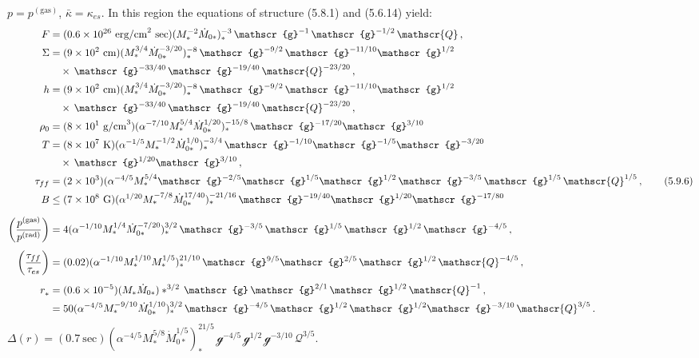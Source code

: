 \noindent
$p = p^{(\text{gas})}$, $\bar{\kappa} = \kappa_{es}$.  In this region the equations of structure (5.8.1) and (5.6.14)
yield:
%
\begin{align}
F &= (0.6 \times 10^{26}~\text{erg/cm}^2~\text{sec})(M_*^{-2} \dot{M}_{0*})_*^{-3}\,\mathscr{g}^{-1}\,\mathscr{g}^{-1/2}\,\mathscr{Q}\,,
\notag\\
\Sigma &= (9 \times 10^2~\text{cm})(M_*^{3/4}\dot{M}_{0*}^{-3/20})_*^{-8}\,\mathscr{g}^{-9/2}\,\mathscr{g}^{-11/10}\mathscr{g}^{1/2}
\notag\\
&\quad \times\,\mathscr{g}^{-33/40}\,\mathscr{g}^{-19/40}\,\mathscr{Q}^{-23/20}\,,
\notag\\
h &= (9 \times 10^2~\text{cm})(M_*^{3/4}\dot{M}_{0*}^{-3/20})_*^{-8}\,\mathscr{g}^{-9/2}\,
\mathscr{g}^{-11/10}\mathscr{g}^{1/2}
\notag\\
&\quad \times\,\mathscr{g}^{-33/40}\,\mathscr{g}^{-19/40}\,\mathscr{Q}^{-23/20}\,,
\notag\\
\rho_0 &= (8 \times 10^1~\text{g/cm}^3)(\alpha^{-7/10} M_*^{5/4} \dot{M}_{0*}^{1/20})_*^{-15/8}\,\mathscr{g}^{-17/20}\mathscr{g}^{3/10}
\notag\\
T &= (8 \times 10^7~\text{K})(\alpha^{-1/5}M_*^{-1/2}\dot{M}_{0*}^{1/0})_*^{-3/4}\,\mathscr{g}^{-1/10}\mathscr{g}^{-1/5}\mathscr{g}^{-3/20}
\notag\\
&\quad \times\,\mathscr{g}^{1/20}\mathscr{g}^{3/10}\,,
\notag\\
\tau_{ff} &= (2 \times 10^3)(\alpha^{-4/5}M_*^{5/4}\mathscr{g}^{-2/5}\mathscr{g}^{1/5}\mathscr{g}^{1/2}\,\mathscr{g}^{-3/5}\,\mathscr{g}^{1/5}\,\mathscr{Q}^{1/5}\,,
\tag{5.9.6}\\
B &\leq (7 \times 10^8~\text{G})(\alpha^{1/20}M_*^{-7/8}\dot{M}_{0*}^{17/40})_*^{-21/16}\,\mathscr{g}^{-19/40}\mathscr{g}^{1/20}\mathscr{g}^{-17/80}
\notag\\[6pt]
\left(\frac{p^{(\text{gas})}}{p^{(\text{rad})}}\right) &= 4(\alpha^{-1/10} M_*^{1/4} \dot{M}_{0*}^{-7/20})_*^{3/2}\,\mathscr{g}^{-3/5}\,\mathscr{g}^{1/5}\,\mathscr{g}^{1/2}\,\mathscr{g}^{-4/5}\,,
\notag\\[4pt]
\left(\frac{\tau_{ff}}{\tau_{es}}\right) &= (0.02)(\alpha^{-1/10} M_*^{1/10} M_*^{1/5})_*^{21/10}\,\mathscr{g}^{9/5}\mathscr{g}^{2/5}\,\mathscr{g}^{1/2}\,\mathscr{Q}^{-4/5}\,,
\notag\\[4pt]
r_*^{} &= (0.6 \times 10^{-5})(M_* \dot{M}_{0*})*^{3/2}\,\mathscr{g}^{\,}\mathscr{g}^{2/1}\,\mathscr{g}^{1/2}\,\mathscr{Q}^{-1}\,,
\notag\\
&= 50(\alpha^{-4/5} M_*^{-9/10} \dot{M}_{0*}^{1/10})_*^{3/2}\,\mathscr{g}^{-4/5}\,\mathscr{g}^{1/2}\,\mathscr{g}^{1/2}\mathscr{g}^{-3/10}\,\mathscr{Q}^{3/5}\,.
\notag
\end{align}
%
$\Delta(r) = (0.7~\text{sec})(\alpha^{-4/5} M_*^{5/8} \dot{M}_{0*}^{1/5})_*^{21/5}\,\mathscr{g}^{-4/5}\,\mathscr{g}^{1/2}\,\mathscr{g}^{-3/10}\,\mathscr{Q}^{3/5}$.

